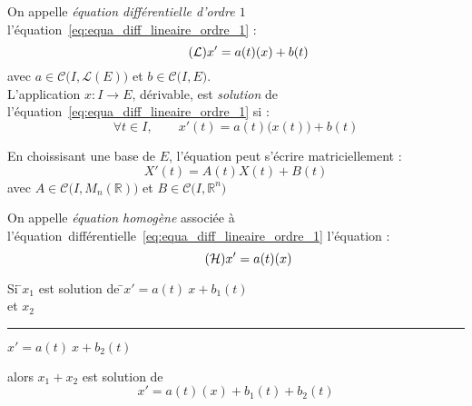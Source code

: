 \documentclass[11pt,a4paper,fleqn,pdftex]{report}
\begin{document}
\begin{dfn}
     On appelle \emph{équation différentielle d'ordre $1$} l'équation~\eqref{eq:equa_diff_lineaire_ordre_1} :
     \begin{equation}\tag{\ensuremath{\mathcal{L}}}\label{eq:equa_diff_lineaire_ordre_1}
     x' = a(t)(x) +b(t)
     \end{equation}
     avec $a\in \mathcal{C}\big( I,\mathscr{L}(E)\big)$ et $b\in \mathcal{C}\big( I,E\big)$.\\
     L'application $x : I\to E$, dérivable, est \emph{solution} de l'équation~\eqref{eq:equa_diff_lineaire_ordre_1} si : 
     \begin{equation}
     \forall t\in I,\qquad x'(t) = a(t)\Big( x(t)\Big) +b(t)
     \end{equation}
\end{dfn}
%
\begin{dfn}
     En choissisant une base de $E$, l'équation peut s'écrire matriciellement :
     \begin{equation}
     X'(t)=A(t)X(t)+B(t)
     \end{equation}
     avec $A\in \mathcal{C}\Big( I,M_n (\mathbb{R})\Big) $ et $B \in \mathcal{C}\big( I,\mathbb{R}^n\big) $
\end{dfn}
\begin{dfn}
     On appelle \emph{équation homogène} associée à l'équation~différentielle~\eqref{eq:equa_diff_lineaire_ordre_1} l'équation : 
     \begin{equation}\tag{\ensuremath{\mathcal{H}}}\label{eq:equa_diff_homogene_ordre_1}
     x'=a(t)(x)
     \end{equation}
\end{dfn}
\begin{theorem}
     \begin{tabbing}
          Si \=$x_1$ est solution de \=$x'=a(t)~x+b_1(t)$\\
          et \>$x_2$ \rule{6em}{0.4pt} \>$x'=a(t)~x+b_2(t)$
     \end{tabbing}
     alors $x_1+x_2$ est solution de 
     \begin{equation}
     x' = a(t)(x) + b_1(t) + b_2(t)
     \end{equation}
\end{theorem}
\end{document}
